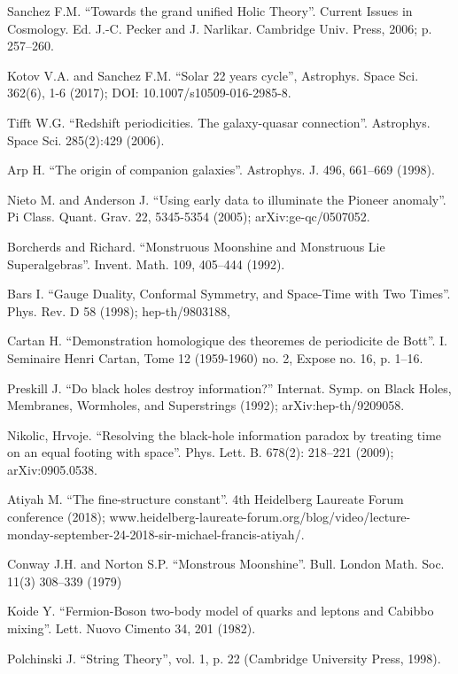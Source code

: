 \documentclass[twoside,draft]{article}
\begin{document}
\begin{sloppypar}
\begin{thebibliography}{99}
 Sanchez F.M. ``Towards the grand unified Holic Theory''. Current
Issues in Cosmology. Ed. J.-C. Pecker and J. Narlikar. Cambridge Univ. Press,
2006; p. 257--260.

 Kotov V.A. and Sanchez F.M. ``Solar 22 years cycle'', Astrophys.
Space Sci. 362(6), 1-6 (2017); DOI: 10.1007/s10509-016-2985-8.

 Tifft W.G. ``Redshift periodicities. The galaxy-quasar
connection''. Astrophys. Space Sci. 285(2):429 (2006).

 Arp H. ``The origin of companion galaxies''. Astrophys. J. 496,
661--669 (1998).

 Nieto M. and Anderson J. ``Using early data to illuminate the
Pioneer anomaly''. Pi Class. Quant. Grav. 22, 5345-5354 (2005);
arXiv:ge-qc/0507052.

 Borcherds and Richard. ``Monstruous Moonshine and Monstruous Lie
Superalgebras''. Invent. Math. 109, 405--444 (1992).

 Bars I. ``Gauge Duality, Conformal Symmetry, and Space-Time with
Two Times''. Phys. Rev. D 58 (1998); hep-th/9803188, 

 Cartan H. ``Demonstration homologique des theoremes de periodicite
de Bott''. I. Seminaire Henri Cartan, Tome 12 (1959-1960) no. 2, Expose no. 16,
p. 1--16.  

 Preskill J. ``Do black holes destroy information?'' Internat.
Symp. on Black Holes, Membranes, Wormholes, and Superstrings (1992);
arXiv:hep-th/9209058.

 Nikolic, Hrvoje. ``Resolving the black-hole information paradox by
treating time on an equal footing with space''. Phys. Lett. B. 678(2):
218--221 (2009); arXiv:0905.0538.

 Atiyah M. ``The fine-structure constant''. 4th Heidelberg Laureate
Forum conference (2018); www.heidelberg-laureate-forum.org/blog/video/lecture-monday-september-24-2018-sir-michael-francis-atiyah/.

 Conway J.H. and Norton S.P. ``Monstrous Moonshine''. Bull. London
Math. Soc. 11(3) 308--339 (1979)

 Koide Y. ``Fermion-Boson two-body model of quarks and leptons and
Cabibbo mixing''.  Lett. Nuovo Cimento 34, 201 (1982).

 Polchinski J. ``String Theory'', vol. 1, p. 22 (Cambridge
University Press, 1998).


\end{thebibliography}
\end{sloppypar}
\end{document}
